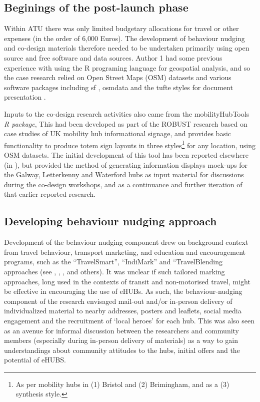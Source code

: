 \documentclass[preprint, 3p,
authoryear]{elsarticle} %
\begin{document}
\subsection{Beginings of the post-launch
phase}\label{beginings-of-the-post-launch-phase}

Within ATU there was only limited budgetary allocations for travel or
other expenses (in the order of 6,000 Euros). The development of
behaviour nudging and co-design materials therefore needed to be
undertaken primarily using open source and free software and data
sources. Author 1 had some previous experience with using the R
programing language for geospatial analysis, and so the case research
relied on Open Street Maps (OSM) datasets and various software packages
including sf \citep{R-sf}, osmdata \citep{osmdata2017} and the tufte
styles for document presentation \citep{R-tufte}.

Inputs to the co-design research activities also came from the
mobilityHubTools \emph{R package}, This had been developed as part of
the ROBUST research based on case studies of UK mobility hub
informational signage, and provides basic functionality to produce totem
sign layouts in three styles\footnote{As per mobility hubs in (1)
  Bristol and (2) Brimingham, and as a (3) synthesis style.} for any
location, using OSM datasets. The initial development of this tool has
been reported elsewhere (in \citet{Reynolds:2026aa}), but provided the
method of generating information displays mock-ups for the Galway,
Letterkenny and Waterford hubs as input material for discussions during
the co-design workshops, and as a continuance and further iteration of
that earlier reported research.

\subsection{Developing behaviour nudging
approach}\label{developing-behaviour-nudging-approach}

Development of the behaviour nudging component drew on background
context from travel behaviour, transport marketing, and education and
encouragement programs, such as the ``TravelSmart'', ``IndiMark'' and
``TravelBlending approaches (see \citet{AMPT:1998aa},
\citet{brog1998marketing}, \citet{Giuliano:2005aa},
\citet{james2017travelsmart} and others). It was unclear if such
tailored marking approaches, long used in the contexts of transit and
non-motorised travel, might be effective in encouraging the use of
eHUBs. As such, the behaviour-nudging component of the research
envisaged mail-out and/or in-person delivery of individualized material
to nearby addresses, posters and leaflets, social media engagement and
the recruitment of `local heroes' for each hub. This was also seen as an
avenue for informal discussion between the researchers and community
members (especially during in-person delivery of materials) as a way to
gain understandings about community attitudes to the hubs, initial
offers and the potential of eHUBS.
\end{document}
